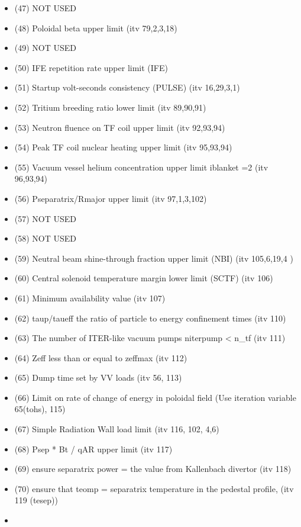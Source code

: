 \documentclass[]{article}
\begin{document}
\begin{itemize}
\begin{itemize}
  \item
    (47) NOT USED
  \item
    (48) Poloidal beta upper limit (itv 79,2,3,18)
  \item
    (49) NOT USED
  \item
    (50) IFE repetition rate upper limit (IFE)
  \item
    (51) Startup volt-seconds consistency (PULSE) (itv 16,29,3,1)
  \item
    (52) Tritium breeding ratio lower limit (itv 89,90,91)
  \item
    (53) Neutron fluence on TF coil upper limit (itv 92,93,94)
  \item
    (54) Peak TF coil nuclear heating upper limit (itv 95,93,94)
  \item
    (55) Vacuum vessel helium concentration upper limit iblanket =2 (itv
    96,93,94)
  \item
    (56) Pseparatrix/Rmajor upper limit (itv 97,1,3,102)
  \item
    (57) NOT USED
  \item
    (58) NOT USED
  \item
    (59) Neutral beam shine-through fraction upper limit (NBI) (itv
    105,6,19,4 )
  \item
    (60) Central solenoid temperature margin lower limit (SCTF) (itv
    106)
  \item
    (61) Minimum availability value (itv 107)
  \item
    (62) taup/taueff the ratio of particle to energy confinement times
    (itv 110)
  \item
    (63) The number of ITER-like vacuum pumps niterpump \textless{} n_tf
    (itv 111)
  \item
    (64) Zeff less than or equal to zeffmax (itv 112)
  \item
    (65) Dump time set by VV loads (itv 56, 113)
  \item
    (66) Limit on rate of change of energy in poloidal field (Use
    iteration variable 65(tohs), 115)
  \item
    (67) Simple Radiation Wall load limit (itv 116, 102, 4,6)
  \item
    (68) Psep * Bt / qAR upper limit (itv 117)
  \item
    (69) ensure separatrix power = the value from Kallenbach divertor
    (itv 118)
  \item
    (70) ensure that teomp = separatrix temperature in the pedestal
    profile, (itv 119 (tesep))
  \item

\end{itemize}
\end{itemize}
\end{document}
